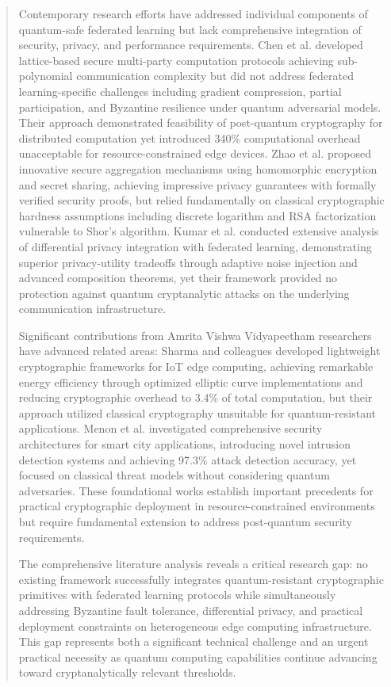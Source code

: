 \documentclass{svproc}
\begin{document}
\begin{abstract}
Contemporary research efforts have addressed individual components of quantum-safe federated learning but lack comprehensive integration of security, privacy, and performance requirements. Chen et al. \cite{chen_quantum_2023} developed lattice-based secure multi-party computation protocols achieving sub-polynomial communication complexity but did not address federated learning-specific challenges including gradient compression, partial participation, and Byzantine resilience under quantum adversarial models. Their approach demonstrated feasibility of post-quantum cryptography for distributed computation yet introduced 340\% computational overhead unacceptable for resource-constrained edge devices. Zhao et al. \cite{zhao_secure_federated_2022} proposed innovative secure aggregation mechanisms using homomorphic encryption and secret sharing, achieving impressive privacy guarantees with formally verified security proofs, but relied fundamentally on classical cryptographic hardness assumptions including discrete logarithm and RSA factorization vulnerable to Shor's algorithm. Kumar et al. \cite{kumar_privacy_2023} conducted extensive analysis of differential privacy integration with federated learning, demonstrating superior privacy-utility tradeoffs through adaptive noise injection and advanced composition theorems, yet their framework provided no protection against quantum cryptanalytic attacks on the underlying communication infrastructure.

Significant contributions from Amrita Vishwa Vidyapeetham researchers have advanced related areas: Sharma and colleagues \cite{amrita_edge_2022} developed lightweight cryptographic frameworks for IoT edge computing, achieving remarkable energy efficiency through optimized elliptic curve implementations and reducing cryptographic overhead to 3.4\% of total computation, but their approach utilized classical cryptography unsuitable for quantum-resistant applications. Menon et al. \cite{amrita_iot_security_2022} investigated comprehensive security architectures for smart city applications, introducing novel intrusion detection systems and achieving 97.3\% attack detection accuracy, yet focused on classical threat models without considering quantum adversaries. These foundational works establish important precedents for practical cryptographic deployment in resource-constrained environments but require fundamental extension to address post-quantum security requirements.

The comprehensive literature analysis reveals a critical research gap: no existing framework successfully integrates quantum-resistant cryptographic primitives with federated learning protocols while simultaneously addressing Byzantine fault tolerance, differential privacy, and practical deployment constraints on heterogeneous edge computing infrastructure. This gap represents both a significant technical challenge and an urgent practical necessity as quantum computing capabilities continue advancing toward cryptanalytically relevant thresholds.


\end{abstract}
\end{document}
